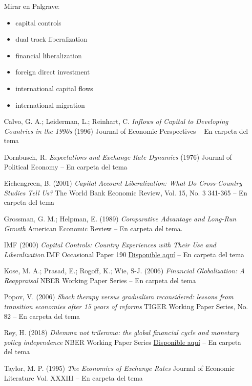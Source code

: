 \documentclass{nuevotema}
\begin{document}
\preguntas

\notas

\bibliografia

Mirar en Palgrave:
\begin{itemize}
	\item capital controls
	\item dual track liberalization
	\item financial liberalization
	\item foreign direct investment
	\item international capital flows
	\item international migration
\end{itemize}

Calvo, G. A.; Leiderman, L.; Reinhart, C. \textit{Inflows of Capital to Developing Countries in the 1990s} (1996) Journal of Economic Perspectives -- En carpeta del tema

Dornbusch, R. \textit{Expectations and Exchange Rate Dynamics} (1976) Journal of Political Economy -- En carpeta del tema

Eichengreen, B. (2001) \textit{Capital Account Liberalization: What Do Cross-Country Studies Tell Us?} The World Bank Economic Review, Vol. 15, No. 3 341-365 -- En carpeta del tema

Grossman, G. M.; Helpman, E. (1989) \textit{Comparative Advantage and Long-Run Growth} American Economic Review -- En carpeta del tema.

IMF (2000) \textit{Capital Controls: Country Experiences with Their Use and Liberalization} IMF Occasional Paper 190 \href{https://www.imf.org/external/pubs/ft/op/op190/index.htm}{Disponible aquí} -- En carpeta del tema

Kose, M. A.; Prasad, E.; Rogoff, K.; Wie, S-J. (2006) \textit{Financial Globalization: A Reappraisal} NBER Working Paper Series -- En carpeta del tema

Popov, V. (2006) \textit{Shock therapy versus gradualism reconsidered: lessons from transition economies after 15 years of reforms} TIGER Working Paper Series, No. 82 -- En carpeta del tema


Rey, H. (2018) \textit{Dilemma not trilemma: the global financial cycle and monetary policy independence} NBER Working Paper Series \href{https://www.nber.org/papers/w21162.pdf}{Disponible aquí} -- En carpeta del tema

Taylor, M. P. (1995) \textit{The Economics of Exchange Rates} Journal of Economic Literature Vol. XXXIII -- En carpeta del tema
\end{document}
